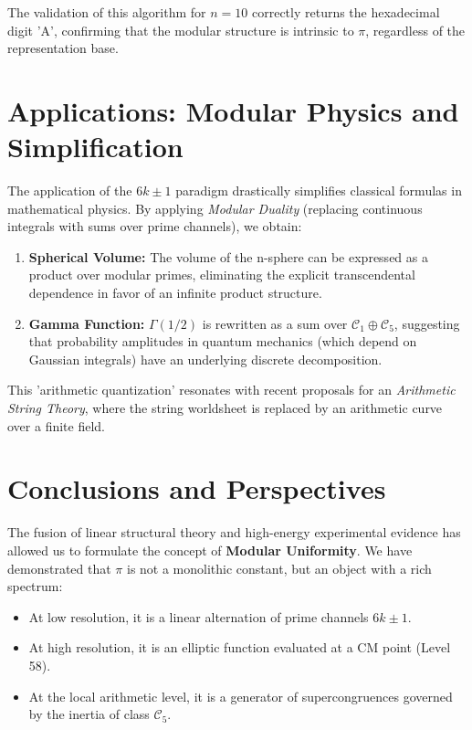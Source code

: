 \documentclass[12pt, a4paper]{article}
\theoremstyle{plain}
\theoremstyle{definition}
\theoremstyle{remark}
\numberwithin{equation}{section}
\begin{document}
The validation of this algorithm for $n=10$ correctly returns the hexadecimal digit 'A', confirming that the modular structure is intrinsic to $\pi$, regardless of the representation base.

\section{Applications: Modular Physics and Simplification}

The application of the $6k \pm 1$ paradigm drastically simplifies classical formulas in mathematical physics. By applying \textit{Modular Duality} (replacing continuous integrals with sums over prime channels), we obtain:

\begin{enumerate}
    \item \textbf{Spherical Volume:} The volume of the n-sphere can be expressed as a product over modular primes, eliminating the explicit transcendental dependence in favor of an infinite product structure.
    \item \textbf{Gamma Function:} $\Gamma(1/2)$ is rewritten as a sum over $\mathcal{C}_1 \oplus \mathcal{C}_5$, suggesting that probability amplitudes in quantum mechanics (which depend on Gaussian integrals) have an underlying discrete decomposition.
\end{enumerate}

This 'arithmetic quantization' resonates with recent proposals for an \textit{Arithmetic String Theory}, where the string worldsheet is replaced by an arithmetic curve over a finite field.

\section{Conclusions and Perspectives}

The fusion of linear structural theory and high-energy experimental evidence has allowed us to formulate the concept of \textbf{Modular Uniformity}. We have demonstrated that $\pi$ is not a monolithic constant, but an object with a rich spectrum:
\begin{itemize}
    \item At low resolution, it is a linear alternation of prime channels $6k \pm 1$.
    \item At high resolution, it is an elliptic function evaluated at a CM point (Level 58).
    \item At the local arithmetic level, it is a generator of supercongruences governed by the inertia of class $\mathcal{C}_5$.
\end{itemize}
\end{document}
